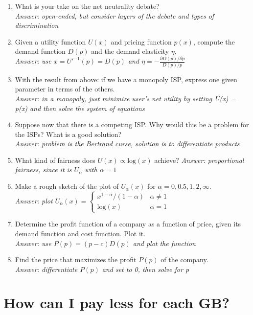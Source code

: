 \documentclass{article}
\begin{document}
\begin{enumerate}
\item What is your take on the net neutrality debate? \\
\textit{Answer: open-ended, but consider layers of the debate and types of discrimination}
\item Given a utility function $U(x)$ and pricing function $p(x)$, compute the demand function $D(p)$ and the demand elasticity $\eta$. \\
\textit{Answer: use $x = U'^{-1}(p) = D(p)$ and $\eta = -\frac{\partial D(p)/\partial p}{D(p)/p}$}
\item With the result from above: if we have a monopoly ISP, express one given parameter in terms of the others. \\
\textit{Answer: in a monopoly, just minimize user's net utility by setting U(x) = p(x) and then solve the system of equations}
\item Suppose now that there is a competing ISP. Why would this be a problem for the ISPs? What is a good solution? \\
\textit{Answer: problem is the Bertrand curse, solution is to differentiate products}
\item What kind of fairness does $U(x) \propto \text{log}(x)$ achieve?
\textit{Answer: proportional fairness, since it is $U_\alpha$ with $\alpha = 1$}
\item Make a rough sketch of the plot of $U_\alpha(x)$ for $\alpha = 0, 0.5, 1, 2, \infty$. \\
\textit{Answer: plot $U_\alpha(x) = \begin{cases} x^{1-\alpha}/(1-\alpha) & \alpha \neq 1 \\ \text{log}(x) & \alpha = 1 \end{cases}$}
\item Determine the profit function of a company as a function of price, given its demand function and cost function. Plot it. \\
\textit{Answer: use $P(p) = (p - c)D(p)$ and plot the function}
\item Find the price that maximizes the profit $P(p)$ of the company. \\
\textit{Answer: differentiate $P(p)$ and set to 0, then solve for p}
\end{enumerate}

\section{How can I pay less for each GB?}
\end{document}

